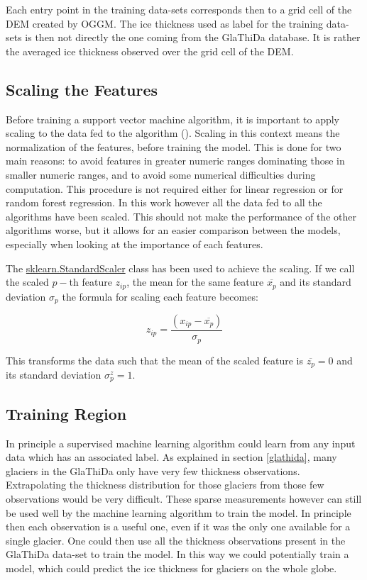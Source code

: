 Each entry point in the training data-sets corresponds then to a grid cell of the DEM created by OGGM. The ice thickness used as label for the training data-sets is then not directly the one coming from the GlaThiDa database. It is rather the averaged ice thickness observed over the grid cell of the DEM.

\subsection{Scaling the Features}
Before training a support vector machine algorithm, it is important to apply scaling to the data fed to the algorithm (\citet{ScalingSVM2003}). Scaling in this context means the normalization of the features, before training the model. This is done for two main reasons: to avoid features in greater numeric ranges dominating those in smaller numeric ranges, and to avoid some numerical difficulties during computation. This procedure is not required either for linear regression or for random forest regression. In this work however all the data fed to all the algorithms have been scaled. This should not make the performance of the other algorithms worse, but it allows for an easier comparison between the models, especially when looking at the importance of each features.

The \href{https://scikit-learn.org/stable/modules/generated/sklearn.preprocessing.StandardScaler.html}{sklearn.StandardScaler} class has been used to achieve the scaling. If we call the scaled $p-$th feature $z_{ip}$, the mean for the same feature $\overline{x_p}$ and its standard deviation $\sigma_p$ the formula for scaling each feature becomes:

\begin{equation}\label{eq:scale}
z_{ip} = \frac{(x_{ip} - \overline{x_p})}{\sigma_p}
\end{equation}

This transforms the data such that the mean of the scaled feature is $\overline{z_p}=0$ and its standard deviation $\sigma^z_p=1$.

\subsection{Training Region}\label{alps}
In principle a supervised machine learning algorithm could learn from any input data which has an associated label. As explained in section \ref{glathida}, many glaciers in the GlaThiDa only have very few thickness observations. Extrapolating the thickness distribution for those glaciers from those few observations would be very difficult. These sparse measurements however can still be used well by the machine learning algorithm to train the model. In principle then each observation is a useful one, even if it was the only one available for a single glacier. One could then use all the thickness observations present in the GlaThiDa data-set to train the model. In this way we could potentially train a model, which could predict the ice thickness for glaciers on the whole globe.

